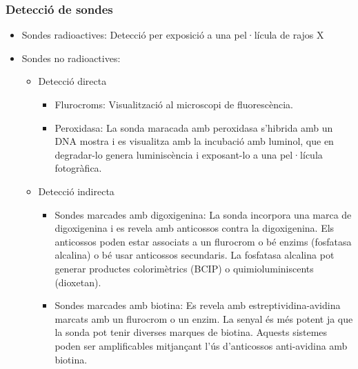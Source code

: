 \subsubsection{Detecció de sondes}
\label{sec:deteccio-de-sondes}

\begin{itemize}
\item Sondes radioactives: Detecció per exposició a una pel·lícula de
  rajos X
\item Sondes no radioactives:
  \begin{itemize}
  \item Detecció directa
  \begin{itemize}
  \item Flurocroms: Visualització al microscopi de fluorescència.
  \item Peroxidasa: La sonda maracada amb peroxidasa s'hibrida amb un
    DNA mostra i es visualitza amb la incubació amb luminol, que en
    degradar-lo genera luminiscència i exposant-lo a una pel·lícula fotogràfica.
  \end{itemize}
  \item Detecció indirecta
    \begin{itemize}
    \item Sondes marcades amb digoxigenina: La sonda incorpora una
      marca de digoxigenina i es revela amb anticossos contra la
      digoxigenina. Els anticossos poden estar associats a un
      flurocrom o bé enzims (fosfatasa alcalina) o bé usar anticossos
      secundaris. La fosfatasa alcalina pot generar productes
      colorimètrics (BCIP) o quimioluminiscents (dioxetan).
    \item Sondes marcades amb biotina: Es revela amb
      estreptividina-avidina marcats amb un flurocrom o un enzim. La
      senyal és més potent ja que la sonda pot tenir diverses marques
      de biotina. Aquests sistemes poden ser amplificables mitjançant
      l'ús d'anticossos anti-avidina amb biotina.
    \end{itemize}
  \end{itemize}
\end{itemize}